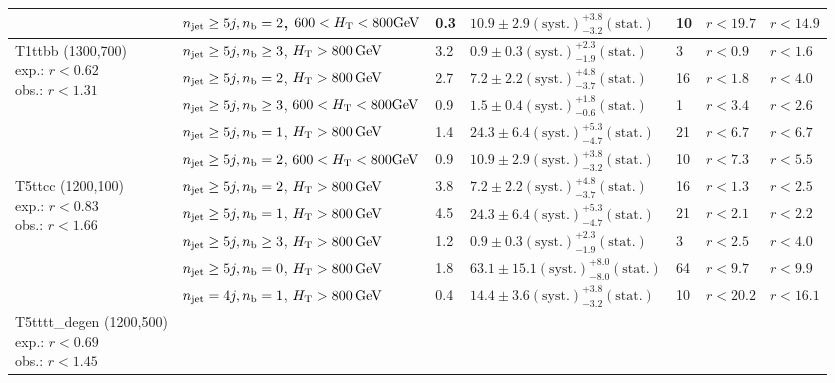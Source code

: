 \begin{table}[h!]
\begin{tabular}{ lllllll }
 & $n_{\mathrm{jet}} \geq5j,n_{\text{b}} =2$, $600 < \mbox{$H_\text{T}$} < 800 \mathrm{GeV}$ & 0.3 & $10.9 \pm 2.9 \mathrm{(syst.)} ^{+3.8}_{-3.2} \mathrm{(stat.)}$ & 10 & $r < 19.7$ & $r < 14.9$\\ \hline
\multirow{5}{*}{\parbox[t]{2cm}{T1ttbb (1300,700)\\exp.: $r<0.62$\\obs.: $r<1.31$}}
 & $n_{\mathrm{jet}} \geq5j,n_{\text{b}} \geq3$, $\mbox{$H_\text{T}$} > 800 \, \mathrm{GeV}$ & 3.2 & $0.9 \pm 0.3 \mathrm{(syst.)} ^{+2.3}_{-1.9} \mathrm{(stat.)}$ & 3 & $r < 0.9$ & $r < 1.6$\\ 
 & $n_{\mathrm{jet}} \geq5j,n_{\text{b}} =2$, $\mbox{$H_\text{T}$} > 800 \, \mathrm{GeV}$ & 2.7 & $7.2 \pm 2.2 \mathrm{(syst.)} ^{+4.8}_{-3.7} \mathrm{(stat.)}$ & 16 & $r < 1.8$ & $r < 4.0$\\ 
 & $n_{\mathrm{jet}} \geq5j,n_{\text{b}} \geq3$, $600 < \mbox{$H_\text{T}$} < 800 \mathrm{GeV}$ & 0.9 & $1.5 \pm 0.4 \mathrm{(syst.)} ^{+1.8}_{-0.6} \mathrm{(stat.)}$ & 1 & $r < 3.4$ & $r < 2.6$\\ 
 & $n_{\mathrm{jet}} \geq5j,n_{\text{b}} =1$, $\mbox{$H_\text{T}$} > 800 \, \mathrm{GeV}$ & 1.4 & $24.3 \pm 6.4 \mathrm{(syst.)} ^{+5.3}_{-4.7} \mathrm{(stat.)}$ & 21 & $r < 6.7$ & $r < 6.7$\\ 
 & $n_{\mathrm{jet}} \geq5j,n_{\text{b}} =2$, $600 < \mbox{$H_\text{T}$} < 800 \mathrm{GeV}$ & 0.9 & $10.9 \pm 2.9 \mathrm{(syst.)} ^{+3.8}_{-3.2} \mathrm{(stat.)}$ & 10 & $r < 7.3$ & $r < 5.5$\\ \hline
\multirow{5}{*}{\parbox[t]{2cm}{T5ttcc (1200,100)\\exp.: $r<0.83$\\obs.: $r<1.66$}}
 & $n_{\mathrm{jet}} \geq5j,n_{\text{b}} =2$, $\mbox{$H_\text{T}$} > 800 \, \mathrm{GeV}$ & 3.8 & $7.2 \pm 2.2 \mathrm{(syst.)} ^{+4.8}_{-3.7} \mathrm{(stat.)}$ & 16 & $r < 1.3$ & $r < 2.5$\\ 
 & $n_{\mathrm{jet}} \geq5j,n_{\text{b}} =1$, $\mbox{$H_\text{T}$} > 800 \, \mathrm{GeV}$ & 4.5 & $24.3 \pm 6.4 \mathrm{(syst.)} ^{+5.3}_{-4.7} \mathrm{(stat.)}$ & 21 & $r < 2.1$ & $r < 2.2$\\ 
 & $n_{\mathrm{jet}} \geq5j,n_{\text{b}} \geq3$, $\mbox{$H_\text{T}$} > 800 \, \mathrm{GeV}$ & 1.2 & $0.9 \pm 0.3 \mathrm{(syst.)} ^{+2.3}_{-1.9} \mathrm{(stat.)}$ & 3 & $r < 2.5$ & $r < 4.0$\\ 
 & $n_{\mathrm{jet}} \geq5j,n_{\text{b}} =0$, $\mbox{$H_\text{T}$} > 800 \, \mathrm{GeV}$ & 1.8 & $63.1 \pm 15.1 \mathrm{(syst.)} ^{+8.0}_{-8.0} \mathrm{(stat.)}$ & 64 & $r < 9.7$ & $r < 9.9$\\ 
 & $n_{\mathrm{jet}} =4j,n_{\text{b}} =1$, $\mbox{$H_\text{T}$} > 800 \, \mathrm{GeV}$ & 0.4 & $14.4 \pm 3.6 \mathrm{(syst.)} ^{+3.8}_{-3.2} \mathrm{(stat.)}$ & 10 & $r < 20.2$ & $r < 16.1$\\ \hline
\multirow{5}{*}{\parbox[t]{2cm}{T5tttt\_degen (1200,500)\\exp.: $r<0.69$\\obs.: $r<1.45$}}

\end{tabular}
\end{table}
